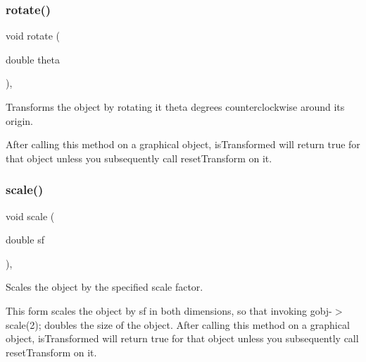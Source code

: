 \subsubsection{\texorpdfstring{rotate()}{rotate()}}
{\footnotesize\ttfamily void rotate (\begin{DoxyParamCaption}\item[{double}]{theta }\end{DoxyParamCaption})\hspace{0.3cm}{\ttfamily [virtual]}, {\ttfamily [inherited]}}



Transforms the object by rotating it {\ttfamily theta} degrees counterclockwise around its origin. 

After calling this method on a graphical object, {\ttfamily is\+Transformed} will return {\ttfamily true} for that object unless you subsequently call {\ttfamily reset\+Transform} on it. \mbox{\label{classsgl_1_1GObject_ad2e1900f730475c2d044817db03b38d6}} 
\subsubsection{\texorpdfstring{scale()}{scale()}\hspace{0.1cm}{\footnotesize\ttfamily [1/2]}}
{\footnotesize\ttfamily void scale (\begin{DoxyParamCaption}\item[{double}]{sf }\end{DoxyParamCaption})\hspace{0.3cm}{\ttfamily [virtual]}, {\ttfamily [inherited]}}



Scales the object by the specified scale factor. 

This form scales the object by {\ttfamily sf} in both dimensions, so that invoking {\ttfamily gobj-\/$>$scale(2);} doubles the size of the object. After calling this method on a graphical object, {\ttfamily is\+Transformed} will return {\ttfamily true} for that object unless you subsequently call {\ttfamily reset\+Transform} on it. \mbox{\label{classsgl_1_1GObject_a63641f69d610d0b951357d35a0c3b1e3}} 
